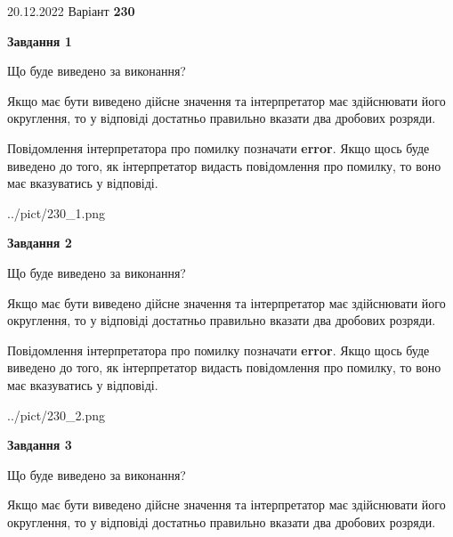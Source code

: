 \documentclass[12pt, ukrainian]{article}
\begin{document}
{20.12.2022 Варіант \No \textbf { 230 }\par}
{
\begin {Large}

{\begin {center}\textbf{Завдання 1}\end {center}}\par
Що буде виведено за виконання? \par

Якщо має бути виведено дійсне значення та інтерпретатор має здійснювати його округлення, 
то у відповіді достатньо правильно вказати два дробових розряди.

Повідомлення інтерпретатора про помилку позначати \textbf{error}.
Якщо щось буде виведено до того, як інтерпретатор видасть повідомлення про помилку, 
то воно має вказуватись у відповіді. \par

\begin{center}
	{../pict/230_1.png}
\end{center}
\newpage

{\begin {center}\textbf{Завдання 2}\end {center}}\par
Що буде виведено за виконання? \par

Якщо має бути виведено дійсне значення та інтерпретатор має здійснювати його округлення, 
то у відповіді достатньо правильно вказати два дробових розряди.

Повідомлення інтерпретатора про помилку позначати \textbf{error}.
Якщо щось буде виведено до того, як інтерпретатор видасть повідомлення про помилку, 
то воно має вказуватись у відповіді. \par

\begin{center}
	{../pict/230_2.png}
\end{center}
\newpage

{\begin {center}\textbf{Завдання 3}\end {center}}\par
Що буде виведено за виконання? \par

Якщо має бути виведено дійсне значення та інтерпретатор має здійснювати його округлення, 
то у відповіді достатньо правильно вказати два дробових розряди.


\end{Large}}
\end{document}

